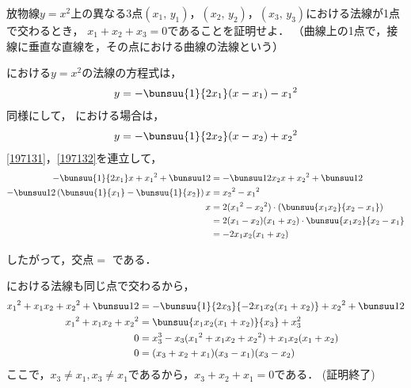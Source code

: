 \begin{problem}
  放物線$y=x^2$上の異なる3点$(x_1, \, y_1)$，$(x_2, \, y_2)$，$(x_3, \, y_3)$における法線が1点で交わるとき，
$x_1+x_2+x_3=0$であることを証明せよ．
（曲線上の1点で，接線に垂直な直線を，その点における曲線の法線という）
\end{problem}

 における$y=x^2$の法線の方程式は，
\begin{align}
  y = -\bunsuu{1}{2x_1}(x-x_1) - {x_1}^2 \label{197131}
\end{align}
同様にして， における場合は，
\begin{align}
  y = -\bunsuu{1}{2x_2}(x-x_2) + {x_2}^2 \label{197132}
\end{align}
\eqref{197131}，\eqref{197132}を連立して，
\begin{align*}
  -\bunsuu{1}{2x_1}x + {x_1}^2 + \bunsuu12 &= -\bunsuu1{2x_2}x + {x_2}^2 + \bunsuu12\\
  -\bunsuu12\left(\bunsuu{1}{x_1} - \bunsuu{1}{x_2}\right)x &= {x_2}^2 - {x_1}^2\\
  x&=2({x_1}^2-{x_2}^2) \cdot \left(\bunsuu{x_1x_2}{x_2-x_1}\right)\\
  &=2(x_1-x_2)(x_1 + x_2) \cdot \bunsuu{x_1x_2}{x_2-x_1}\\
  &=-2x_1x_2(x_1+x_2)
\end{align*}

したがって，交点$=$
である．

 における法線も同じ点で交わるから，
\begin{align*}
  {x_1}^2 + x_1x_2 + {x_2}^2 + \bunsuu12 &= -\bunsuu{1}{2x_3}\{-2x_1x_2(x_1+x_2)\} + {x_2}^2 + \bunsuu12 \\
  {x_1}^2 + x_1x_2 + {x_2}^2 &= \bunsuu{x_1x_2(x_1+x_2)}{x_3} + x_3^2\\
  0 &= x_3^3 - x_3({x_1}^2 + x_1x_2 + {x_2}^2) + x_1x_2(x_1+x_2) \\
  0 &= (x_3+x_2+x_1)(x_3-x_1)(x_3-x_2)
\end{align*}
ここで，$x_3 \neq x_1, x_3 \neq x_1$であるから，$x_3 + x_2 + x_1 = 0$である．
\hfill
(証明終了)
